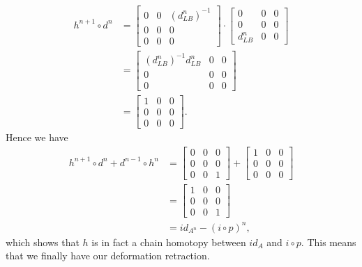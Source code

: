 \begin{align*}
    h^{n+1}\circ d^n 
    &=
    \begin{bmatrix}
    0 & 0 & (d_{LB}^{n})^{-1}\\
    0 & 0 & 0\\
    0 & 0 & 0
    \end{bmatrix}
    \cdot 
    \begin{bmatrix}
    0 & 0 & 0 \\
    0 & 0 & 0 \\
    d^{n}_{LB} & 0 & 0
    \end{bmatrix} \\
    &=
    \begin{bmatrix}
    (d_{LB}^{n})^{-1}d^{n}_{LB} & 0 & 0\\
    0 & 0 & 0\\
    0 & 0 & 0
    \end{bmatrix} \\
    &=
    \begin{bmatrix}
    1 & 0 & 0\\
    0 & 0 & 0\\
    0 & 0 & 0
    \end{bmatrix} .
\end{align*}
Hence we have
\begin{align*}
    h^{n+1}\circ d^n + d^{n-1}\circ h^n 
    &= 
    \begin{bmatrix}
    0 & 0 & 0 \\
    0 & 0 & 0 \\
    0 & 0 & 1 
    \end{bmatrix}
    + 
    \begin{bmatrix}
    1 & 0 & 0 \\
    0 & 0 & 0 \\
    0 & 0 & 0 
    \end{bmatrix} \\
    &= 
    \begin{bmatrix}
    1 & 0 & 0 \\
    0 & 0 & 0 \\
    0 & 0 & 1
    \end{bmatrix} \\
    &= 
    id_{A^n} - (i\circ p)^n , 
\end{align*}
which shows that $h$ is in fact a chain homotopy between $id_A$ and $i\circ p$. This means that we finally have our deformation retraction.
\begin{center}
\end{center}